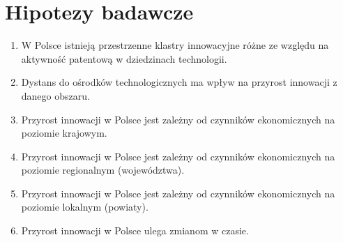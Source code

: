 \section{Hipotezy badawcze}

  \begin{enumerate}

\item
W Polsce istnieją przestrzenne klastry innowacyjne różne ze 
względu na aktywność patentową w dziedzinach technologii.



\item
Dystans do ośrodków technologicznych ma wpływ na przyrost innowacji 
z danego obszaru.



\item
Przyrost innowacji w Polsce jest zależny od czynników ekonomicznych 
na poziomie krajowym.



\item
Przyrost innowacji w Polsce jest zależny od czynników ekonomicznych 
na poziomie regionalnym (województwa).



\item
Przyrost innowacji w Polsce jest zależny od czynników ekonomicznych 
na poziomie lokalnym (powiaty).



\item
Przyrost innowacji w Polsce ulega zmianom w czasie.

\end{enumerate}